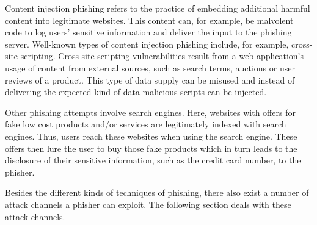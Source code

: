 \begin{description}[leftmargin=0cm]
	\item[Content Injection Phishing] Content injection phishing refers to the practice of embedding additional harmful content into legitimate websites. This content can, for example, be malvolent code to log users' sensitive information and deliver the input to the phishing server. Well-known types of content injection phishing include, for example, cross-site scripting. Cross-site scripting vulnerabilities result from a web application's usage of content from external sources, such as search terms, auctions or user reviews of a product. This type of data supply can be misused and instead of delivering the expected kind of data malicious scripts can be injected.
	\item[Search Engine Phishing] Other phishing attempts involve search engines. Here, websites with offers for fake low cost products and/or services are legitimately indexed with search engines. Thus, users reach these websites when using the search engine. These offers then lure the user to buy those fake products which in turn leads to the disclosure of their sensitive information, such as the credit card number, to the phisher.
\end{description}

Besides the different kinds of techniques of phishing, there also exist a number of attack channels a phisher can exploit. The following section deals with these attack channels.

